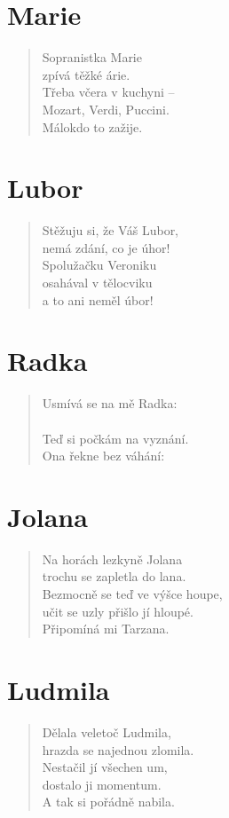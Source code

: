 \section*{Marie}
\begin{verse}
Sopranistka Marie\\
zpívá těžké árie.\\
Třeba včera v kuchyni --\\
Mozart, Verdi, Puccini.\\
Málokdo to zažije.
\end{verse}

\section*{Lubor}
\begin{verse}
Stěžuju si, že Váš Lubor,\\
nemá zdání, co je úhor!\\
Spolužačku Veroniku\\
osahával v tělocviku\\
a to ani neměl úbor!
\end{verse}

\section*{Radka}
\begin{verse}
Usmívá se na mě Radka:\\
\\
Teď si počkám na vyznání.\\
Ona řekne bez váhání:\\
\end{verse}

\section*{Jolana}
\begin{verse}
Na horách lezkyně Jolana\\
trochu se zapletla do lana.\\
Bezmocně se teď ve výšce houpe,\\
učit se uzly přišlo jí hloupé.\\
Připomíná mi Tarzana.
\end{verse}

\section*{Ludmila}
\begin{verse}
Dělala veletoč Ludmila,\\
hrazda se najednou zlomila.\\
Nestačil jí všechen um,\\
dostalo ji momentum.\\
A tak si pořádně nabila.
\end{verse}

